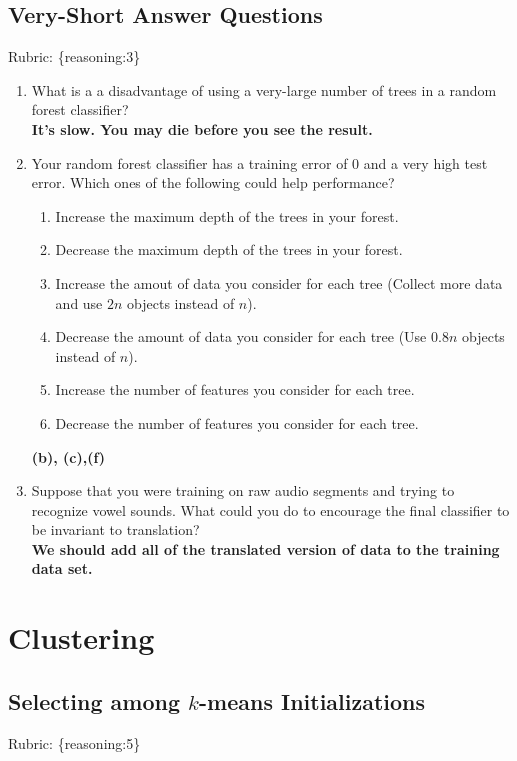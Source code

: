 \documentclass{article}
\def\blu#1{{\color{blu}#1}}
\def\gre#1{{\color{gre}#1}}
\def\enum#1{\begin{enumerate}#1\end{enumerate}}
\def\rubric#1{\gre{Rubric: \{#1\}}}{}
\begin{document}
\subsection{Very-Short Answer Questions}
\rubric{reasoning:3}

\blu{\enum{
\item What is a a disadvantage of using a very-large number of trees in a random forest classifier?\\
\textbf{It's slow. You may die before you see the result.}
\item Your random forest classifier has a training error of 0 and a very high test error. Which ones of the following could help performance?
\enum{
\item Increase the maximum depth of the trees in your forest.
\item Decrease the maximum depth of the trees in your forest.
\item Increase the amout of data you consider for each tree (Collect more data and use $2n$ objects instead of $n$).
\item Decrease the amount of data you consider for each tree (Use $0.8n$ objects instead of $n$).
\item Increase the number of features you consider for each tree.
\item Decrease the number of features you consider for each tree.
}
\textbf{(b), (c),(f)}
\item Suppose that you were training on raw audio segments and trying to recognize vowel sounds. What could you do to encourage the final classifier to be invariant to translation?\\
\textbf{We should add all of the translated version of data to the training data set. }
}
}

\section{Clustering}


\subsection{Selecting among $k$-means Initializations}
\rubric{reasoning:5}
\end{document}
